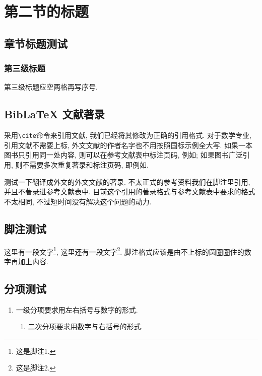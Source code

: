 
\section{第二节的标题}

\zhlipsum[1]

\subsection{章节标题测试}

\subsubsection{第三级标题}

第三级标题应空两格再写序号.

\zhlipsum[1]

\subsection{BibLaTeX 文献著录}

采用\verb|\cite|命令来引用文献, 我们已经将其修改为正确的引用格式. 对于数学专业, 引用文献不需要上标\cite{atiyah_introduction_1969}, 外文文献的作者名字也不用按照国标示例全大写. 如果一本图书只引用同一处内容, 则可以在参考文献表中标注页码, 例如\cite{herrlich_axiom_2006}; 如果图书广泛引用, 则不需要多次重复著录和标注页码, 即例如\cite{atiyah_introduction_1969}.






测试一下翻译成外文的外文文献的著录\cite{sally_history_1985}. 不太正式的参考资料我们在脚注里引用, 并且不著录进参考文献表中. 目前这个引用的著录格式与参考文献表中要求的格式不太相同, 不过短时间没有解决这个问题的动力.

\zhlipsum[1]

\subsection{脚注测试}

这里有一段文字\footnote{这是脚注1.}, 这里还有一段文字\footnote{这是脚注2.}. 脚注格式应该是由不上标的圆圈圈住的数字再加上内容.

\zhlipsum

\subsection{分项测试}

\begin{enumerate}
  \item 一级分项要求用左右括号与数字的形式.
  \begin{enumerate}
    \item 二次分项要求用数字与右括号的形式.
  \end{enumerate}
\end{enumerate}

\zhlipsum[1]
